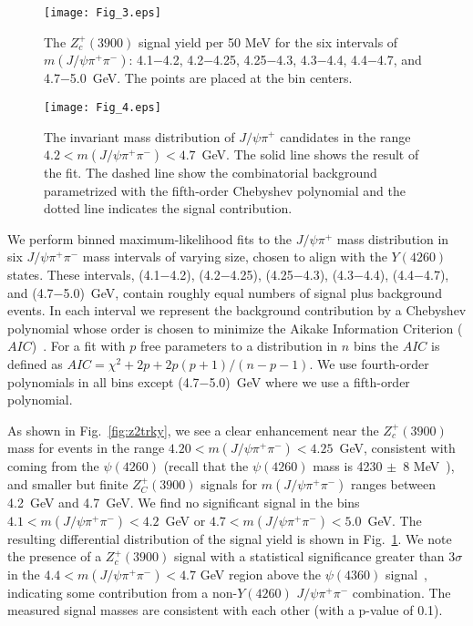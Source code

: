 \documentclass[aps,prd,twocolumn,superscriptaddress,groupedaddress,floatfix]{revtex4}
\begin{document}
\begin{figure}[htb]
\texttt{[image: Fig\_3.eps]}
\caption{\label{fig:zfromy} The  $Z_c^+(3900)$ signal yield per 50 MeV 
 for the six intervals of $m(J/\psi \pi^+ \pi^-)$:
4.1$-$4.2, 4.2$-$4.25, 4.25$-$4.3,
4.3$-$4.4, 4.4$-$4.7, and 4.7$-$5.0~GeV. The points are placed at the bin centers.
}
\end{figure}





\begin{figure}[htbp]

\texttt{[image: Fig\_4.eps]}
\caption{\label{fig:z4247} 
The invariant mass distribution of  $J/\psi \pi^+$ candidates in the  range 
$4.2<m(J/\psi \pi^+ \pi^-)<4.7$~GeV.
The solid line shows the result of the fit. The dashed line show the combinatorial background
parametrized with the fifth-order Chebyshev polynomial
and the dotted line indicates the signal contribution.
}
\end{figure}




We   perform  binned maximum-likelihood fits to the  $J/\psi \pi^+$ mass distribution
in six  $J/\psi \pi^+ \pi^-$ mass intervals
of varying size, chosen to align with the  $Y(4260)$  states. 
These intervals, (4.1$-$4.2), (4.2$-$4.25), (4.25$-$4.3), (4.3$-$4.4), (4.4$-$4.7), and
(4.7$-$5.0)~GeV, contain roughly equal numbers of signal plus background events. In each interval we
represent the background contribution by a Chebyshev polynomial whose order is chosen
to  minimize the Aikake Information Criterion  ($AIC$)~\cite{aic}.
For a fit with $p$ free parameters to a distribution in $n$ bins the $AIC$ is defined as
$AIC = \chi^2 +2p + 2p(p+1)/(n-p-1)$. 
We use fourth-order polynomials in all bins except (4.7$-$5.0)~GeV where we use a fifth-order polynomial.

As shown in Fig.~\ref{fig:z2trky}, we see a clear enhancement near  the  $Z_c^+(3900)$ 
mass for events in the range $4.20<m(J/\psi \pi^+ \pi^-)<4.25$~GeV, consistent with coming from
the $\psi(4260)$ (recall that the $\psi(4260)$ mass is 4230 $\pm$~8 MeV~\cite{pdg}), 
  and smaller but finite $Z_C^+(3900)$ signals  for $m(J/\psi \pi^+ \pi^-)$ ranges
between 4.2~GeV and 4.7~GeV.
We find no significant signal in the bins  $4.1<m(J/\psi \pi^+ \pi^-)<4.2$~GeV or
  $4.7<m(J/\psi \pi^+ \pi^-)<5.0$~GeV.
The resulting differential distribution of the signal yield is shown in
Fig.~\ref{fig:zfromy}.
We note the presence of a $Z_c^+(3900)$  signal with a statistical significance 
greater than $3\sigma$ in the $4.4<m(J/\psi \pi^+ \pi^-)<4.7$ GeV region  above 
 the $\psi(4360)$  signal~\cite{bes3y}, indicating  some contribution from
 a non-$Y(4260)$  $J/\psi \pi^+ \pi^-$ combination.
The measured signal masses are consistent with each other (with a p-value of 0.1).
\end{document}
